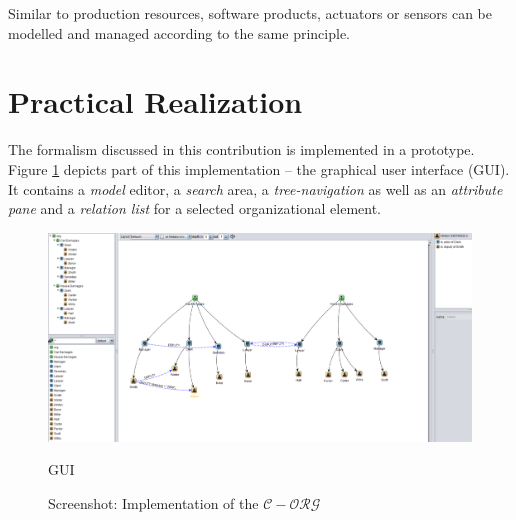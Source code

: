 Similar to production resources, software products, actuators or sensors can be modelled and managed according to the same principle. 

\section{Practical Realization}

The formalism discussed in this contribution is implemented in a prototype. Figure \ref{proto-gui} depicts part of this implementation -- the graphical user interface (GUI). It contains a \emph{model} editor, a \emph{search} area, a \emph{tree-navigation} as well as an \emph{attribute pane} and a \emph{relation list} for a selected organizational element.

\begin{figure}
\centering
\includegraphics[width=\textwidth]{Figures/corg}
\caption{Screenshot: Implementation of the $\mathcal{C-ORG}$} GUI
\label{proto-gui}
\end{figure}

